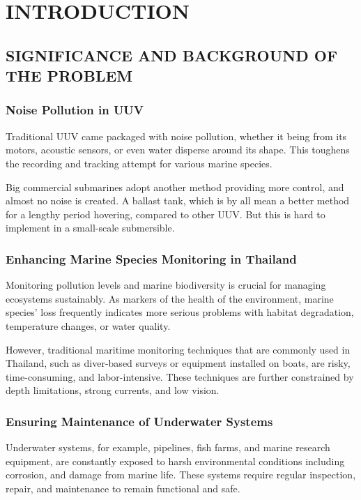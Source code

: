 \chapter{INTRODUCTION}

\section{SIGNIFICANCE AND BACKGROUND OF THE PROBLEM}
\subsection{Noise Pollution in UUV}

Traditional UUV came packaged with noise pollution, whether it being from its motors, acoustic sensors, or even water disperse around its shape. This toughens the recording and tracking attempt for various marine species. 

Big commercial submarines adopt another method providing more control, and almost no noise is created. A ballast tank, which is by all mean a better method for a lengthy period hovering, compared to other UUV. But this is hard to implement in a small-scale submersible.

\subsection{Enhancing Marine Species Monitoring in Thailand}

Monitoring pollution levels and marine biodiversity is crucial for managing
ecosystems sustainably. As markers of the health of the environment, marine species' loss frequently indicates more serious problems with habitat degradation, temperature changes, or water quality.

However, traditional maritime monitoring techniques that are commonly
used in Thailand, such as diver-based surveys or equipment installed on boats, are risky, time-consuming, and labor-intensive. These techniques are further constrained by depth limitations, strong currents, and low vision.

\subsection{Ensuring Maintenance of Underwater Systems}

Underwater systems, for example, pipelines, fish farms, and marine research
equipment, are constantly exposed to harsh environmental conditions including corrosion, and damage from marine life. These systems require regular inspection, repair, and maintenance to remain functional and safe.



